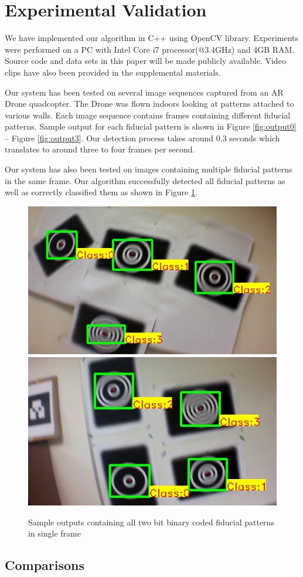 \documentclass[runningheads]{llncs}
\begin{document}
\section{Experimental Validation}

We have implemented our algorithm in C++ using OpenCV library.
Experiments were performed on a PC with Intel Core i7 processor(@3.4GHz) and 4GB RAM.
Source code and data sets in this paper will be made publicly available.  Video clips
have also been provided in the supplemental materials.

Our system has been tested on several image sequences captured from an AR Drone
quadcopter.  The Drone was flown indoors looking at patterns attached to
various walls. Each image sequence contains frames containing different fiducial
patterns. Sample output for each fiducial pattern is shown in Figure
\ref{fig:output0} -- Figure \ref{fig:output3}. Our detection process takes
around 0.3 seconds which translates to around three to four frames per second.



Our system has also been tested on images containing multiple fiducial patterns
in the same frame. Our algorithm successfully detected all fiducial patterns as
well as correctly classified them as shown in Figure \ref{fig:output_all}.

\begin{figure}[ht!]
\centering
  \includegraphics[width=.45\linewidth]{output_all_2.jpg}
  \includegraphics[width=.45\linewidth]{new_results/output_test_all1.jpg}
  \caption{Sample outputs containing all two bit binary coded fiducial patterns
  in single frame}
  \label{fig:output_all}
\end{figure}

\subsection{Comparisons}
\end{document}
